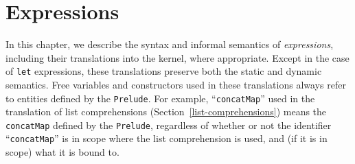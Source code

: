 %
%
\chapter{Expressions}
\label{expressions}

In this chapter, we describe the syntax and informal semantics of
\Haskell{} {\em expressions}, including their translations into the
\Haskell{} kernel, where appropriate.  Except in the case of \mbox{\tt let}
expressions, these translations preserve both the static and dynamic
semantics.  Free variables and constructors used in these translations
always refer to entities defined by the \mbox{\tt Prelude}.  For example,
``\mbox{\tt concatMap}'' used in the translation of list comprehensions
(Section~\ref{list-comprehensions}) means the \mbox{\tt concatMap} defined by
the \mbox{\tt Prelude}, regardless of whether or not the identifier ``\mbox{\tt concatMap}'' is in
scope where the list comprehension is used, and (if it is in scope)
what it is bound to.

